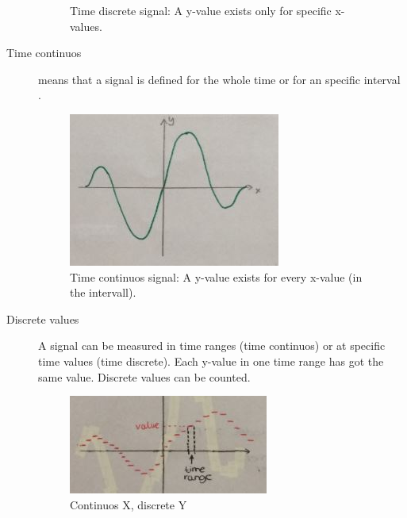 \begin{description}
\begin{figure}[!h]
			\caption[Time discrete signal]{Time discrete signal: A y-value exists only for specific x-values.}
			\label{fig:timediscrete}
		\end{figure}
	\item[Time continuos] means that a signal is defined for the whole time or for an specific interval .
		\begin{figure}[!h]
			\centering
			\includegraphics[width=0.7\linewidth]{images_LA/timecontinuos}
			\caption[Time continuos signal]{Time continuos signal: A y-value exists for every x-value (in the intervall).}
			\label{fig:timecontinuos}
		\end{figure}
	\item[Discrete values] A signal can be measured in time ranges (time continuos)  or at specific time values (time discrete). Each y-value in one time range has got the same value. Discrete values can be counted.
		\begin{figure}[!h]
			\centering
			\includegraphics[width=0.7\linewidth]{images_LA/discreteY_continuosX}
			\caption[Continuos X, discrete Y]{Continuos X, discrete Y}
			\label{fig:discreteY_continuosX}
		\end{figure}
		

\end{description}
